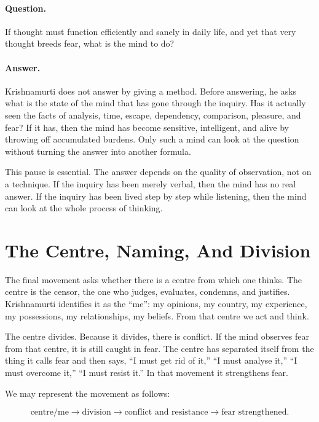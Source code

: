 \paragraph{Question.} If thought must function efficiently and sanely in daily life, and yet that very thought breeds fear, what is the mind to do?

\paragraph{Answer.} Krishnamurti does not answer by giving a method. Before answering, he asks what is the state of the mind that has gone through the inquiry. Has it actually seen the facts of analysis, time, escape, dependency, comparison, pleasure, and fear? If it has, then the mind has become sensitive, intelligent, and alive by throwing off accumulated burdens. Only such a mind can look at the question without turning the answer into another formula.

This pause is essential. The answer depends on the quality of observation, not on a technique. If the inquiry has been merely verbal, then the mind has no real answer. If the inquiry has been lived step by step while listening, then the mind can look at the whole process of thinking.

\section{The Centre, Naming, And Division}

The final movement asks whether there is a centre from which one thinks. The centre is the censor, the one who judges, evaluates, condemns, and justifies. Krishnamurti identifies it as the ``me'': my opinions, my country, my experience, my possessions, my relationships, my beliefs. From that centre we act and think.

The centre divides. Because it divides, there is conflict. If the mind observes fear from that centre, it is still caught in fear. The centre has separated itself from the thing it calls fear and then says, ``I must get rid of it,'' ``I must analyse it,'' ``I must overcome it,'' ``I must resist it.'' In that movement it strengthens fear.

We may represent the movement as follows:

\begin{equation}
\text{centre/me}
\longrightarrow
\text{division}
\longrightarrow
\text{conflict and resistance}
\longrightarrow
\text{fear strengthened}.
\end{equation}

